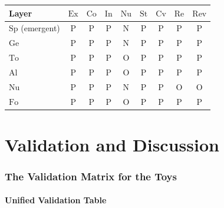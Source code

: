 \documentclass[11pt,a4paper]{article}
\theoremstyle{definition}
\theoremstyle{plain}
\newcommand{\Sp}{\mathrm{Sp}}
\newcommand{\Ge}{\mathrm{Ge}}
\newcommand{\To}{\mathrm{To}}
\newcommand{\Al}{\mathrm{Al}}
\newcommand{\Nu}{\mathrm{Nu}}
\newcommand{\Fo}{\mathrm{Fo}}
\newcommand{\Pmark}{\mathrm{P}}
\newcommand{\Nmark}{\mathrm{N}}
\newcommand{\Omark}{\mathrm{O}}
\begin{document}
\begin{center}
\begin{tabular}{l|cccccccc}
  \toprule
  Layer & $\mathrm{Ex}$ & $\mathrm{Co}$ & $\mathrm{In}$
  & $\mathrm{Nu}$ & $\mathrm{St}$ & $\mathrm{Cv}$
  & $\mathrm{Re}$ & $\mathrm{Rev}$ \\
  \midrule
  $\Sp$ (emergent) & $\Pmark$ & $\Pmark$ & $\Pmark$ & $\Nmark$ & $\Pmark$ & $\Pmark$ & $\Pmark$ & $\Pmark$ \\
  $\Ge$   & $\Pmark$ & $\Pmark$ & $\Pmark$ & $\Nmark$ & $\Pmark$ & $\Pmark$ & $\Pmark$ & $\Pmark$ \\
  $\To$   & $\Pmark$ & $\Pmark$ & $\Pmark$ & $\Omark$ & $\Pmark$ & $\Pmark$ & $\Pmark$ & $\Pmark$ \\
  $\Al$   & $\Pmark$ & $\Pmark$ & $\Pmark$ & $\Omark$ & $\Pmark$ & $\Pmark$ & $\Pmark$ & $\Pmark$ \\
  $\Nu$   & $\Pmark$ & $\Pmark$ & $\Pmark$ & $\Nmark$ & $\Pmark$ & $\Pmark$ & $\Omark$ & $\Omark$ \\
  $\Fo$   & $\Pmark$ & $\Pmark$ & $\Pmark$ & $\Omark$ & $\Pmark$ & $\Pmark$ & $\Pmark$ & $\Pmark$ \\
  \bottomrule
\end{tabular}
\end{center}

\part{Validation and Discussion}

\section{The Validation Matrix for the Toys}
\label{sec:validation-new}

\subsection{Unified Validation Table}
\end{document}

